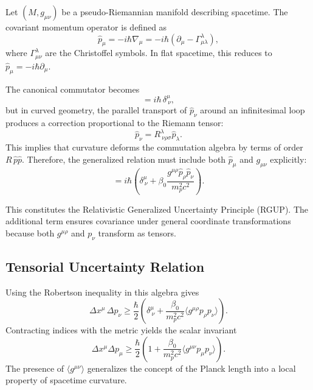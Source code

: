 \documentclass[11pt,oneside]{book}
\numberwithin{equation}{chapter}
\begin{document}
Let $(M,g_{\mu\nu})$ be a pseudo-Riemannian manifold describing spacetime.  
The covariant momentum operator is defined as
\begin{equation}
\hat{p}_\mu = -i\hbar\nabla_\mu = -i\hbar\left(\partial_\mu-\Gamma^\lambda_{\mu\lambda}\right),
\end{equation}
where $\Gamma^\lambda_{\mu\nu}$ are the Christoffel symbols.  
In flat spacetime, this reduces to $\hat{p}_\mu=-i\hbar\partial_\mu$.

The canonical commutator becomes
\begin{equation}
[\hat{x}^\mu,\hat{p}_\nu] = i\hbar\,\delta^\mu_{\ \nu},
\end{equation}
but in curved geometry, the parallel transport of $\hat{p}_\nu$ around an infinitesimal loop produces a correction proportional to the Riemann tensor:
\begin{equation}
[\nabla_\rho,\nabla_\sigma]\hat{p}_\nu
= R^\lambda_{\ \nu\rho\sigma}\hat{p}_\lambda.
\end{equation}
This implies that curvature deforms the commutation algebra by terms of order $R\,\hat{p}\hat{p}$.  
Therefore, the generalized relation must include both $\hat{p}_\mu$ and $g_{\mu\nu}$ explicitly:
\begin{equation}
[\hat{x}^\mu,\hat{p}_\nu]
=i\hbar\left(\delta^\mu_{\ \nu}
+\beta_0\frac{g^{\mu\rho}\hat{p}_\rho\hat{p}_\nu}{m_p^2 c^2}\right).
\end{equation}

This constitutes the Relativistic Generalized Uncertainty Principle (RGUP).  
The additional term ensures covariance under general coordinate transformations because both $g^{\mu\rho}$ and $p_\nu$ transform as tensors.

\subsection*{Tensorial Uncertainty Relation}

Using the Robertson inequality in this algebra gives
\begin{equation}
\Delta x^\mu\,\Delta p_\nu
\ge
\frac{\hbar}{2}
\left(
\delta^\mu_{\ \nu}
+\frac{\beta_0}{m_p^2c^2}
\langle g^{\mu\rho}p_\rho p_\nu\rangle
\right).
\end{equation}
Contracting indices with the metric yields the scalar invariant
\begin{equation}
\Delta x^\mu\Delta p_\mu
\ge
\frac{\hbar}{2}\left(
1+\frac{\beta_0}{m_p^2c^2}\langle g^{\mu\nu}p_\mu p_\nu\rangle
\right).
\end{equation}
The presence of $\langle g^{\mu\nu}\rangle$ generalizes the concept of the Planck length into a local property of spacetime curvature.
\end{document}
